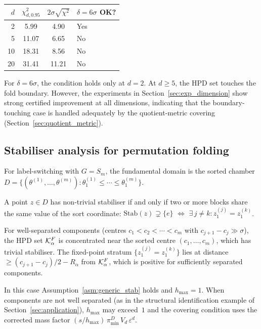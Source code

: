 \begin{center}
\begin{tabular}{rccl}
\hline
$d$ & $\chi^2_{d,0.95}$ & $2\sigma\sqrt{\chi^2}$ & $\delta = 6\sigma$ OK? \\
\hline
2  & 5.99 & 4.90 & Yes \\
5  & 11.07 & 6.65 & No \\
10 & 18.31 & 8.56 & No \\
20 & 31.41 & 11.21 & No \\
\hline
\end{tabular}
\end{center}

For $\delta = 6\sigma$, the condition holds only at $d = 2$.
At $d \geq 5$, the HPD set touches the fold boundary.
However, the experiments in Section~\ref{sec:exp_dimension}
show strong certified improvement at all dimensions, indicating
that the boundary-touching case is handled adequately by the
quotient-metric covering (Section~\ref{sec:quotient_metric}).


\subsection{Stabiliser analysis for permutation folding}
\label{app:stabiliser}

For label-switching with $G = S_m$, the fundamental domain
is the sorted chamber
$D = \{(\theta^{(1)}, \ldots, \theta^{(m)}) :
\theta^{(1)}_1 \leq \cdots \leq \theta^{(m)}_1\}$.

A point $z \in D$ has non-trivial stabiliser if and only if
two or more blocks share the same value of the sort coordinate:
$\mathrm{Stab}(z) \supsetneq \{e\}$
$\Longleftrightarrow$
$\exists\, j \neq k : z^{(j)}_1 = z^{(k)}_1$.

For well-separated components (centres
$c_1 < c_2 < \cdots < c_m$ with $c_{j+1} - c_j \gg \sigma$),
the HPD set $\mathcal{K}_\alpha^F$ is concentrated near the sorted
centre $(c_1, \ldots, c_m)$, which has trivial stabiliser.
The fixed-point stratum
$\{z^{(j)}_1 = z^{(k)}_1\}$ lies at distance
$\geq (c_{j+1} - c_j)/2 - R_\alpha$ from $\mathcal{K}_\alpha^F$,
which is positive for sufficiently separated components.

In this case Assumption~\ref{asm:generic_stab} holds and
$h_{\max} = 1$.  When components are not well separated
(as in the structural identification example of
Section~\ref{sec:application}), $h_{\max}$ may exceed~$1$
and the covering condition uses the corrected mass factor
$(s/h_{\max})\,\pi_{\min}^D\,V_d\,\varepsilon^d$.


